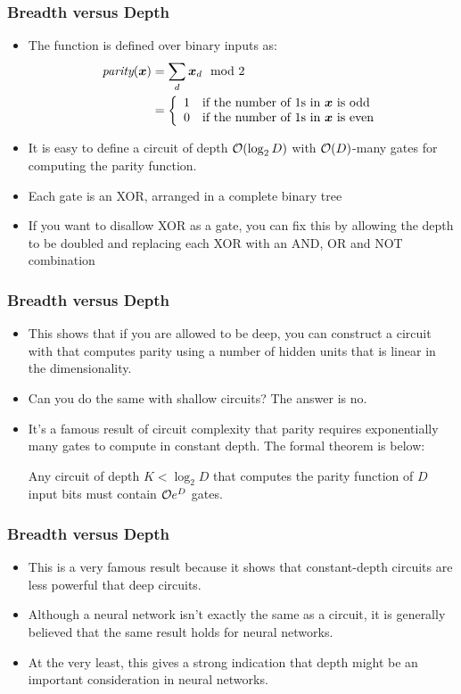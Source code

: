 \documentclass[trans]{beamer}
\begin{document}
\begin{frame}
  \frametitle{Breadth versus Depth}
\begin{itemize}
\item
  The function is defined over binary inputs as:
%
\begin{align}
\textit{parity}({\boldsymbol{x}})
&= \sum_d {\boldsymbol{x}}_d \mod 2 \\
&= \left\{\begin{array}{ll} 1 & \text{if the number of $1$s in ${\boldsymbol{x}}$ is odd} \\
           0 & \text{if the number of $1$s in ${\boldsymbol{x}}$ is even} \end{array}\right.
\end{align}
%
%
\item It is easy to define a circuit of depth $\mathcal{O}(\log_2 D)$ with
$\mathcal{O}(D)$-many gates for computing the parity function.
\item  Each gate is
an XOR, arranged in a complete binary tree
\item If you want to disallow XOR as a
gate, you can fix this by allowing the depth to be doubled and
replacing each XOR with an AND, OR and NOT combination
\end{itemize}
\end{frame}

\begin{frame}
  \frametitle{Breadth versus Depth}
\begin{itemize}
\item
This shows that if you are allowed to be deep, you can construct a
circuit with that computes parity using a number of hidden units that
is linear in the dimensionality.
\item   Can you do the same with shallow
circuits?  The answer is no. 
\item  It's a famous result of circuit
complexity that parity requires exponentially many gates to compute in
constant depth.  The formal theorem is below:
\begin{theorem} \label{thm:nnet:parity}
  Any circuit of depth $K < \log_2 D$ that computes the parity
  function of $D$ input bits must contain $\mathcal{O}{e^D}$ gates.
\end{theorem}
\end{itemize}
\end{frame}

\begin{frame}
  \frametitle{Breadth versus Depth}
\begin{itemize}
\item
This is a very famous result because it shows that constant-depth
circuits are less powerful that deep circuits.  
\item Although a neural
network isn't exactly the same as a circuit, it is generally believed
that the same result holds for neural networks.
\item  At the very least,
this gives a strong indication that depth might be an important
consideration in neural networks.
\end{itemize}
\end{frame}
\end{document}
